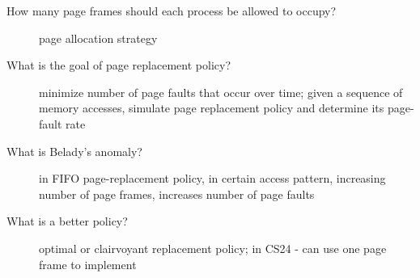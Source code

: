 \documentclass[10pt]{article}
\begin{document}
\begin{description}
\item[How many page frames should each process be allowed to occupy?]
  page allocation strategy
\item[What is the goal of page replacement policy?]
  minimize number of page faults that occur over time;
  given a sequence of memory accesses, simulate page replacement policy and determine its page-fault rate
\item[What is Belady's anomaly?]
  in FIFO page-replacement policy, in certain access pattern, increasing number of page frames, increases number of page faults
\item[What is a better policy?]
  optimal or clairvoyant replacement policy;
  in CS24 - can use one page frame to implement
\end{description}

\begin{description}

\end{description}
\end{document}
